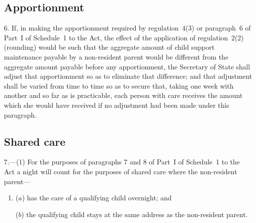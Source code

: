 \documentclass[12pt,a4paper]{article}
\begin{document}

\subsection[6. Apportionment]{Apportionment}

6.  If, in making the apportionment required by regulation~4(3) or paragraph~6 of Part~I of Schedule~1 to the Act, the effect of the application of regulation~2(2) (rounding) would be such that the aggregate amount of child support maintenance payable by a non-resident parent would be different from the aggregate amount payable before any apportionment, the Secretary of State shall adjust that apportionment so as to eliminate that difference; and that adjustment shall be varied from time to time so as to secure that, taking one week with another and so far as is practicable, each person with care receives the amount which she would have received if no adjustment had been made under this paragraph.

\subsection[7. Shared care]{Shared care}

7.---(1)  For the purposes of paragraphs 7 and 8 of Part~I of Schedule~1 to the Act a night will count for the purposes of shared care where the non-resident parent—
\begin{enumerate}\item[]
($a$) has the care of a qualifying child overnight; and

($b$) the qualifying child stays at the same address as the non-resident parent.
\end{enumerate}
\end{document}
